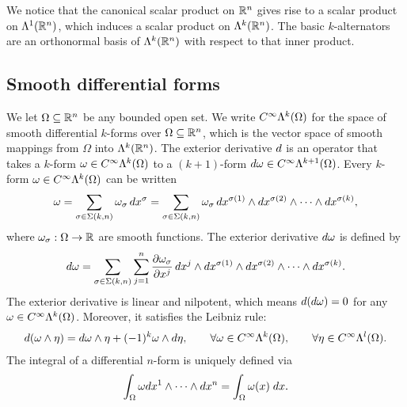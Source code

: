 \documentclass[10pt,a4paper]{article}
\begin{document}
We notice that the canonical scalar product on ${\mathbb R}^{n}$ gives rise to a scalar product on $\Lambda^{1}({\mathbb R}^{n})$,
which induces a scalar product on $\Lambda^{k}({\mathbb R}^{n})$.
The basic $k$-alternators are an orthonormal basis of $\Lambda^{k}({\mathbb R}^{n})$ with respect to that inner product. 

\subsection{Smooth differential forms}

We let $\Omega \subseteq {\mathbb R}^{n}$ be any bounded open set.
We write $C^{\infty}\Lambda^{k}(\Omega)$ for the space of smooth differential $k$-forms over $\Omega \subseteq {\mathbb R}^{n}$,
which is the vector space of smooth mappings from $\Omega$ into $\Lambda^{k}({\mathbb R}^{n})$.
The exterior derivative \( d \) is an operator that takes a \( k \)-form \( \omega \in C^{\infty}\Lambda^{k}(\Omega) \) 
to a \((k+1)\)-form \( d\omega \in C^{\infty}\Lambda^{k+1}(\Omega) \). 
Every \( k \)-form \( \omega \in C^{\infty}\Lambda^{k}(\Omega) \) can be written 
\begin{gather}\label{math:canonicalrepresentation}
    \omega 
    = 
    \sum_{ \sigma \in \Sigma(k,n) } 
    \omega_{\sigma} \, 
    dx^{\sigma}
    = 
    \sum_{ \sigma \in \Sigma(k,n) } 
    \omega_{\sigma} \, 
    dx^{\sigma(1)} \wedge dx^{\sigma(2)} \wedge \cdots \wedge dx^{\sigma(k)},
\end{gather}
where \( \omega_{\sigma} : \Omega \rightarrow {\mathbb R} \) are smooth functions.
The exterior derivative \( d\omega \) is defined by
\begin{gather*}
    d\omega = 
    \sum_{ \sigma \in \Sigma(k,n) } 
    \sum_{j=1}^{n} 
    \frac{\partial \omega_{\sigma}}{\partial x^j} 
    \, dx^j \wedge 
    dx^{\sigma(1)} \wedge dx^{\sigma(2)} \wedge \cdots \wedge dx^{\sigma(k)}.
\end{gather*}
The exterior derivative is linear and nilpotent, which means 
\( d(d\omega) = 0 \) for any \( \omega \in C^{\infty}\Lambda^{k}(\Omega) \).
Moreover, it satisfies the Leibniz rule:
\begin{gather*} 
    d(\omega \wedge \eta) 
    = 
    d\omega \wedge \eta + (-1)^{k} \omega \wedge d\eta, 
    \qquad \forall \omega \in C^{\infty}\Lambda^{k}(\Omega), 
    \qquad \forall \eta \in C^{\infty}\Lambda^{l}(\Omega).
\end{gather*}
The integral of a differential $n$-form is uniquely defined via 
\begin{gather*}
    \int_{\Omega} \omega dx^{1} \wedge \dots \wedge dx^{n} = \int_{\Omega} \omega(x) \;dx
    . 
\end{gather*}
\end{document}
